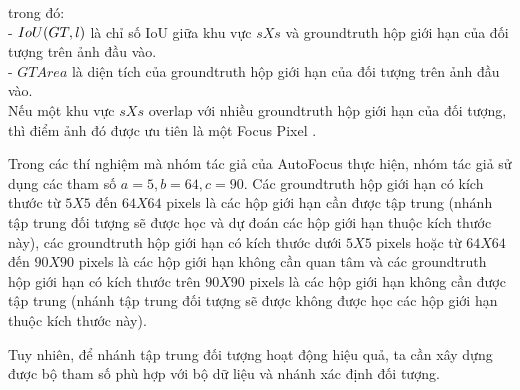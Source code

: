 {    \noindent
    trong đó: \\
    - $IoU\index{IoU}(GT, l)$ là chỉ số IoU giữa khu vực $s X s$ và groundtruth hộp giới hạn của đối tượng trên ảnh đầu vào. \\
    - $GTArea$ là diện tích của groundtruth hộp giới hạn của đối tượng trên ảnh đầu vào. \\
    Nếu một khu vực $s X s$ overlap với nhiều groundtruth hộp giới hạn của đối tượng, thì điểm ảnh đó được ưu tiên là một Focus Pixel .

    \noindent
    Trong các thí nghiệm mà nhóm tác giả của AutoFocus \cite{najibi2019autofocus} thực hiện, nhóm tác giả sử dụng các tham số $a = 5, b = 64, c = 90$.
    Các groundtruth hộp giới hạn có kích thước từ $5 X 5$ đến $64 X 64$ pixels là các hộp giới hạn cần được tập trung (nhánh tập trung đối tượng sẽ được học và dự đoán các hộp giới hạn thuộc kích thước này), các groundtruth hộp giới hạn có kích thước dưới $5 X 5$ pixels hoặc từ $64 X 64$ đến $90 X 90$ pixels là các hộp giới hạn không cần quan tâm và các groundtruth hộp giới hạn có kích thước trên $90 X 90$ pixels là các hộp giới hạn không cần được tập trung (nhánh tập trung đối tượng sẽ được không được học các hộp giới hạn thuộc kích thước này).
    
    \noindent
    Tuy nhiên, để nhánh tập trung đối tượng hoạt động hiệu quả, ta cần xây dựng được bộ tham số phù hợp với bộ dữ liệu và nhánh xác định đối tượng.

}
